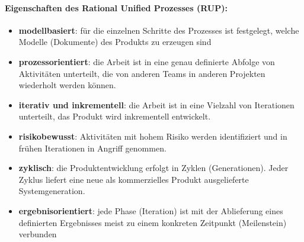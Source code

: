 \paragraph{Eigenschaften des Rational Unified Prozesses (RUP):}
\begin{itemize}
	\item  \textbf{modellbasiert}: für die einzelnen Schritte des Prozesses ist festgelegt, welche Modelle (Dokumente) des Produkts zu erzeugen sind
	\item \textbf{prozessorientiert}: die Arbeit ist in eine genau definierte Abfolge von Aktivitäten unterteilt, die von anderen Teams in anderen Projekten wiederholt werden können.
	\item \textbf{iterativ und inkrementell}: die Arbeit ist in eine Vielzahl von Iterationen unterteilt, das Produkt wird inkrementell entwickelt.
	\item \textbf{risikobewusst}: Aktivitäten mit hohem Risiko werden identifiziert und in frühen Iterationen in Angriff genommen.
	\item \textbf{zyklisch}: die Produktentwicklung erfolgt in Zyklen (Generationen). Jeder Zyklus liefert eine neue als kommerzielles Produkt ausgelieferte Systemgeneration.
	\item \textbf{ergebnisorientiert}: jede Phase (Iteration) ist mit der Ablieferung eines definierten Ergebnisses meist zu einem konkreten Zeitpunkt (Meilenstein) verbunden
\end{itemize}

